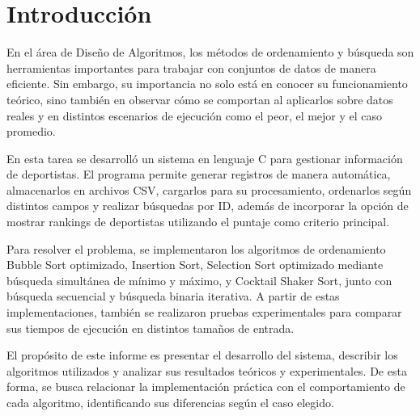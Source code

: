 \chapter{Introducción}
En el área de Diseño de Algoritmos, los métodos de ordenamiento y búsqueda son herramientas importantes para trabajar con conjuntos de datos de manera eficiente. Sin embargo, su importancia no solo está en conocer su funcionamiento teórico, sino también en observar cómo se comportan al aplicarlos sobre datos reales y en distintos escenarios de ejecución como el peor, el mejor y el caso promedio.

En esta tarea se desarrolló un sistema en lenguaje C para gestionar información de deportistas. El programa permite generar registros de manera automática, almacenarlos en archivos CSV, cargarlos para su procesamiento, ordenarlos según distintos campos y realizar búsquedas por ID, además de incorporar la opción de mostrar rankings de deportistas utilizando el puntaje como criterio principal.

Para resolver el problema, se implementaron los algoritmos de ordenamiento Bubble Sort optimizado, Insertion Sort, Selection Sort optimizado mediante búsqueda simultánea de mínimo y máximo, y Cocktail Shaker Sort, junto con búsqueda secuencial y búsqueda binaria iterativa. A partir de estas implementaciones, también se realizaron pruebas experimentales para comparar sus tiempos de ejecución en distintos tamaños de entrada.

El propósito de este informe es presentar el desarrollo del sistema, describir los algoritmos utilizados y analizar sus resultados teóricos y experimentales. De esta forma, se busca relacionar la implementación práctica con el comportamiento de cada algoritmo, identificando sus diferencias según el caso elegido.
